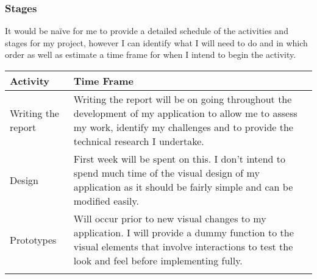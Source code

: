 \subsubsection{Stages}\label{stages}

It would be \mbox{na\"{i}ve} for me to provide a detailed schedule of
the activities and stages for my project, however I can identify what I
will need to do and in which order as well as estimate a time frame for
when I intend to begin the activity.

\begin{longtable}[]{@{}ll@{}}
\toprule
\begin{minipage}[b]{0.20\columnwidth}\raggedright\strut
Activity\strut
\end{minipage} & \begin{minipage}[b]{0.74\columnwidth}\raggedright\strut
Time Frame\strut
\end{minipage}\tabularnewline
\midrule
\endhead
\begin{minipage}[t]{0.20\columnwidth}\raggedright\strut
Writing the report\strut
\end{minipage} & \begin{minipage}[t]{0.74\columnwidth}\raggedright\strut
Writing the report will be on going throughout the development of my
application to allow me to assess my work, identify my challenges and to
provide the technical research I undertake.\strut
\end{minipage}\tabularnewline
\begin{minipage}[t]{0.20\columnwidth}\raggedright\strut
Design\strut
\end{minipage} & \begin{minipage}[t]{0.74\columnwidth}\raggedright\strut
First week will be spent on this. I don't intend to spend much time of
the visual design of my application as it should be fairly simple and
can be modified easily.\strut
\end{minipage}\tabularnewline
\begin{minipage}[t]{0.20\columnwidth}\raggedright\strut
Prototypes\strut
\end{minipage} & \begin{minipage}[t]{0.74\columnwidth}\raggedright\strut
Will occur prior to new visual changes to my application. I will provide
a dummy function to the visual elements that involve interactions to
test the look and feel before implementing fully.\strut
\end{minipage}\tabularnewline
\begin{minipage}[t]{0.20\columnwidth}\raggedright\strut

\end{minipage}
\end{longtable}
